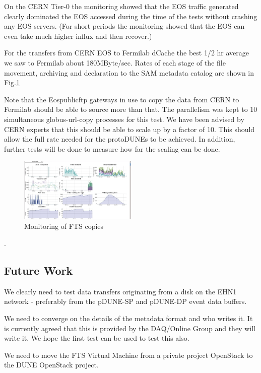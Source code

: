 \documentclass[pdftex,12pt,letter]{article}
\begin{document}
On the CERN Tier-0 the monitoring showed that the EOS traffic generated clearly dominated the EOS accessed during the time of the tests without crashing any EOS servers. (For short periods the monitoring showed that the EOS can even take much higher influx and then recover.)

For the transfers from CERN EOS to Fermilab dCache the best 1/2 hr average we saw to Fermilab about 180MByte/sec. Rates of each stage of the file movement, archiving and declaration to the SAM metadata catalog are shown in  Fig.\ref{fig:FTStoFermilab}

Note that the Eospublicftp gateways in use to copy the data from CERN to Fermilab should be able to source more than that. The parallelism was kept to 10 simultaneous globus-url-copy processes for this test. We have  been advised by CERN experts that this should be able to scale up by a factor of 10.  This should allow the full rate needed for the protoDUNEs to be achieved. In addition, further tests will be done to measure how far the scaling can be done.


\begin{figure}[tbh]
  \centering
  \includegraphics[width=0.5\textwidth]{./ReportImages/FTS.jpg}
  \caption{Monitoring of FTS copies}
  \label{fig:FTStoFermilab}
  
\end{figure}. 



\subsection {Future Work}
We clearly need to test data transfers originating from a disk on the EHN1 network - preferably from the pDUNE-SP and pDUNE-DP event data buffers. 

We need to converge on  the details of the metadata format and who writes it. It is currently agreed that this is provided by the DAQ/Online Group and they will write it. We hope the first test can be used to test this also. 

We need to move the FTS Virtual Machine from a private project OpenStack to the  DUNE OpenStack project. 
\end{document}
